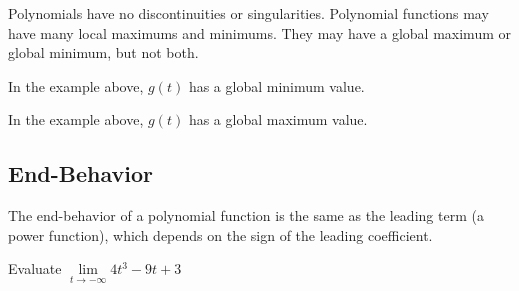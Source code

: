 \documentclass{ximera}
\begin{document}
Polynomials have no discontinuities or singularities.  Polynomial functions may have many local maximums and minimums. They may have a global maximum or global minimum, but not both.







\begin{question}

In the example above, $g(t)$ has a global minimum value.



\begin{multipleChoice}
\end{multipleChoice}

\end{question}



\begin{question}

In the example above, $g(t)$ has a global maximum value.



\begin{multipleChoice}
\end{multipleChoice}

\end{question}










\subsection{End-Behavior}


The end-behavior of a polynomial function is the same as the leading term (a power function), which depends on the sign of the leading coefficient.











\begin{question}

Evaluate $\lim\limits_{t \to -\infty} 4 t^3 - 9 t + 3$


\begin{multipleChoice}
\choice [correct]{$-\infty$}
\choice {$\infty$}
\end{multipleChoice}

\end{question}
\end{document}
